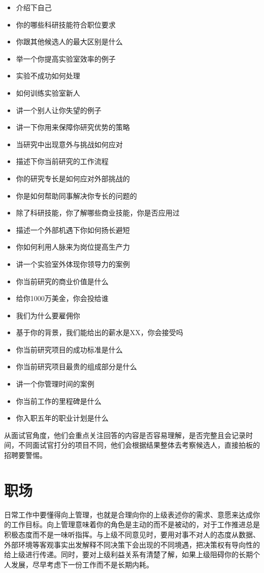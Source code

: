 \documentclass[]{tufte-book}
\providecommand{\tightlist}{%
  \setlength{\itemsep}{0pt}\setlength{\parskip}{0pt}}
\begin{document}
\begin{itemize}
\tightlist
\item
  介绍下自己
\item
  你的哪些科研技能符合职位要求
\item
  你跟其他候选人的最大区别是什么
\item
  举一个你提高实验室效率的例子
\item
  实验不成功如何处理
\item
  如何训练实验室新人
\item
  讲一个别人让你失望的例子
\item
  讲一下你用来保障你研究优势的策略
\item
  当研究中出现意外与挑战如何应对
\item
  描述下你当前研究的工作流程
\item
  你的研究专长是如何应对外部挑战的
\item
  你是如何帮助同事解决你专长的问题的
\item
  除了科研技能，你了解哪些商业技能，你是否应用过
\item
  描述一个外部机遇下你如何扬长避短
\item
  你如何利用人脉来为岗位提高生产力
\item
  讲一个实验室外体现你领导力的案例
\item
  你当前研究的商业价值是什么
\item
  给你1000万美金，你会投给谁
\item
  我们为什么要雇佣你
\item
  基于你的背景，我们能给出的薪水是XX，你会接受吗
\item
  你当前研究项目的成功标准是什么
\item
  你当前研究项目最贵的组成部分是什么
\item
  讲一个你管理时间的案例
\item
  你当前工作的里程碑是什么
\item
  你入职五年的职业计划是什么
\end{itemize}

从面试官角度，他们会重点关注回答的内容是否容易理解，是否完整且会记录时间，不同面试官打分的项目不同，他们会根据结果整体去考察候选人，直接拍板的招聘要警惕。

\hypertarget{ux804cux573a}{%
\section{职场}\label{ux804cux573a}}

日常工作中要懂得向上管理，也就是合理向你的上级表述你的需求、意愿来达成你的工作目标。向上管理意味着你的角色是主动的而不是被动的，对于工作推进总是积极态度而不是一味听指挥。与上级不同意见时，要用对事不对人的态度从数据、外部环境等客观事实出发解释不同决策下会出现的不同境遇，把决策权有导向性的给上级进行传递。同时，要对上级利益关系有清楚了解，如果上级阻碍你的长期个人发展，尽早考虑下一份工作而不是长期内耗。
\end{document}
